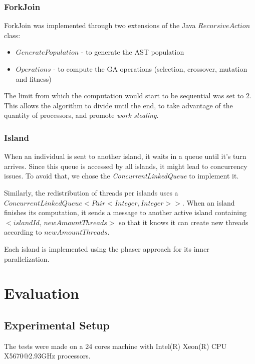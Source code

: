 \documentclass[runningheads]{llncs}
\begin{document}
\subsubsection{ForkJoin} \hfill \par
ForkJoin was implemented through two extensions of the Java \(RecursiveAction\) class:

\begin{itemize}
\item $GeneratePopulation$ - to generate the AST population
\item $Operations$ - to compute the GA operations (selection, crossover, mutation and fitness)
\end{itemize}

The limit from which the computation would start to be sequential was set to $2$. This allows the algorithm to divide until the end, to take advantage of the quantity of processors, and promote \textit{work stealing}.
\subsubsection{Island} \hfill \par

When an individual is sent to another island, it waits in a queue until it's turn arrives. Since this queue is accessed by all islands, it might lead to concurrency issues. To avoid that, we chose the \emph{ConcurrentLinkedQueue} to implement it.

Similarly, the redistribution of threads per islands uses a \(ConcurrentLinkedQueue<Pair<Integer, Integer>>\). When an island finishes its computation, it sends a message to another active island containing \(<islandId, \,newAmountThreads>\) so that it knows it can create new threads according to $newAmountThreads$.

Each island is implemented using the phaser approach for its inner parallelization.

\section{Evaluation}

\subsection{Experimental Setup}
The tests were made on a 24 cores machine with Intel(R) Xeon(R) CPU X5670@2.93GHz processors.
\end{document}
